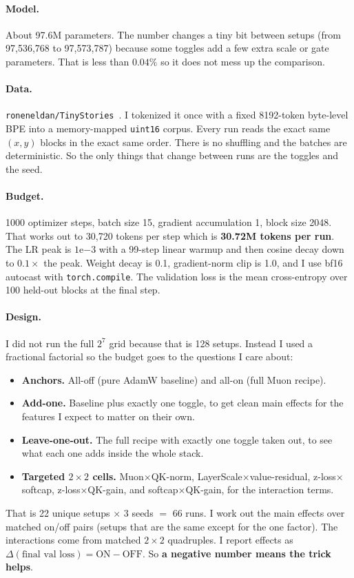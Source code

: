 \documentclass[11pt]{article}
\begin{document}
\paragraph{Model.} About 97.6M parameters. The number changes a tiny bit between
setups (from 97{,}536{,}768 to 97{,}573{,}787) because some toggles add a few extra
scale or gate parameters. That is less than $0.04\%$ so it does not mess up the
comparison.

\paragraph{Data.} \texttt{roneneldan/TinyStories}~\cite{eldan2023tinystories}. I
tokenized it once with a fixed 8192-token byte-level BPE into a memory-mapped
\texttt{uint16} corpus. Every run reads the exact same $(x,y)$ blocks in the exact
same order. There is no shuffling and the batches are deterministic. So the only
things that change between runs are the toggles and the seed.

\paragraph{Budget.} 1000 optimizer steps, batch size 15, gradient accumulation 1,
block size 2048. That works out to 30{,}720 tokens per step which is
\textbf{30.72M tokens per run}. The LR peak is $1\mathrm{e}{-3}$ with a 99-step
linear warmup and then cosine decay down to $0.1\times$ the peak. Weight decay is
0.1, gradient-norm clip is 1.0, and I use bf16 autocast with
\texttt{torch.compile}. The validation loss is the mean cross-entropy over 100
held-out blocks at the final step.

\paragraph{Design.} I did not run the full $2^7$ grid because that is 128 setups.
Instead I used a fractional factorial so the budget goes to the questions I care
about:
\begin{itemize}
  \item \textbf{Anchors.} All-off (pure AdamW baseline) and all-on (full Muon recipe).
  \item \textbf{Add-one.} Baseline plus exactly one toggle, to get clean main effects for the features I expect to matter on their own.
  \item \textbf{Leave-one-out.} The full recipe with exactly one toggle taken out, to see what each one adds inside the whole stack.
  \item \textbf{Targeted $2\times2$ cells.} Muon$\times$QK-norm, LayerScale$\times$value-residual, z-loss$\times$softcap, z-loss$\times$QK-gain, and softcap$\times$QK-gain, for the interaction terms.
\end{itemize}
That is 22 unique setups $\times$ 3 seeds $=$ 66 runs. I work out the main effects
over matched on/off pairs (setups that are the same except for the one factor).
The interactions come from matched $2\times2$ quadruples. I report effects as
$\Delta(\text{final val loss}) = \text{ON} - \text{OFF}$. So \textbf{a negative
number means the trick helps}.
\end{document}
